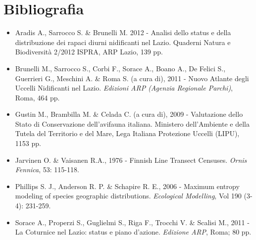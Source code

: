 \newpage
\section*{Bibliografia}
\begin{itemize}\itemsep0pt
 \item Aradis A., Sarrocco S. \& Brunelli M. 2012 - Analisi dello
status e della distribuzione dei rapaci diurni nidificanti nel Lazio.
Quaderni Natura e Biodiversit\`a 2/2012 ISPRA, ARP Lazio, 139 pp.

 \item Brunelli M., Sarrocco S., Corbi F., Sorace A., Boano A., De Felici S.,
Guerrieri G., Meschini A. \& Roma S. (a cura di), 2011 - Nuovo
Atlante degli Uccelli Nidificanti nel Lazio. \textit{Edizioni ARP (Agenzia
Regionale Parchi)}, Roma, 464 pp.

 \item Gustin M., Brambilla M. \& Celada C. (a cura di), 2009 - Valutazione
dello Stato di Conservazione dell{\textquoteright}avifauna italiana.
Ministero dell{\textquoteright}Ambiente e della Tutela del Territorio e
del Mare, Lega Italiana Protezione Uccelli (LIPU), 1153 pp.

 \item Jarvinen O. \& Vaisanen R.A., 1976 - Finnish Line Transect Censuses.
\textit{Ornis Fennica}, 53: 115-118.

 \item Phillips S. J., Anderson R. P. \& Schapire R. E., 2006 - Maximum entropy
modeling of species geographic distributions. \textit{Ecological
Modelling}, Vol 190 (3-4): 231-259.

 \item Sorace A., Properzi S., Guglielmi S., Riga F., Trocchi V. \& Scalisi M.,
2011 - La Coturnice nel Lazio: status e piano
d{\textquoteright}azione. \textit{Edizione ARP}, Roma; 80 pp.
\end{itemize}
